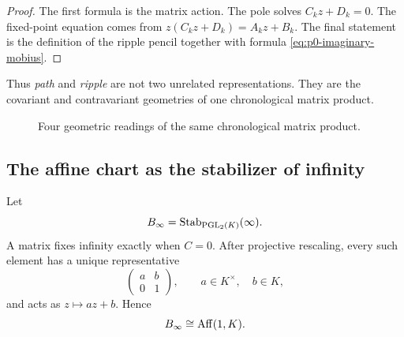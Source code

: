 \begin{proof}
The first formula is the matrix action.  The pole solves
$C_kz+D_k=0$.  The fixed-point equation comes from
$z(C_kz+D_k)=A_kz+B_k$.  The final statement is the definition of the ripple
pencil together with formula \eqref{eq:p0-imaginary-mobius}.
\end{proof}

Thus \emph{path} and \emph{ripple} are not two unrelated representations.  They
are the covariant and contravariant geometries of one chronological matrix
product.

\begin{figure}[t]
\centering
{}
\caption{Four geometric readings of the same chronological matrix product.}
\label{fig:p0-projective-four-readings}
\end{figure}

\subsection{The affine chart as the stabilizer of infinity}

Let
\[
  B_\infty=\operatorname{Stab}_{\operatorname{PGL}_2(K)}(\infty).
\]
A matrix fixes infinity exactly when $C=0$.  After projective rescaling, every
such element has a unique representative
\[
  \begin{pmatrix}a&b\\0&1\end{pmatrix},
  \qquad a\in K^\times,\quad b\in K,
\]
and acts as $z\mapsto az+b$.  Hence
\begin{equation}\label{eq:p0-affine-stabilizer}
  B_\infty\cong\operatorname{Aff}(1,K).
\end{equation}

